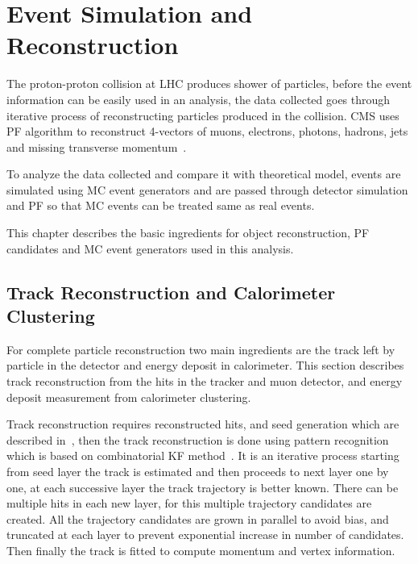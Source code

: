\chapter{
  Event Simulation and Reconstruction
 }\label{ch_reco}

The proton-proton collision at \gls{LHC} produces shower of particles, before
the event information can be easily used in an analysis, the data collected goes
through iterative process of reconstructing particles produced in the collision.
\gls{CMS} uses \gls{PF} algorithm to reconstruct 4-vectors of muons, electrons,
photons, hadrons, jets and missing transverse momentum~\cite{cms-particle-flow-2017}.

To analyze the data collected and compare it with theoretical model, events are
simulated using \gls{MC} event generators and are passed through detector simulation
and \gls{PF} so that \gls{MC} events can be treated same as real events.

This chapter describes the basic ingredients for object reconstruction, \gls{PF}
candidates and \gls{MC} event generators used in this analysis.

\section{
  Track Reconstruction and Calorimeter Clustering
 }\label{ch_reco:track-calo}

For complete particle reconstruction two main ingredients are the track left by particle
in the detector and energy deposit in calorimeter.
This section describes track reconstruction
from the hits in the tracker and muon detector, and energy deposit measurement from
calorimeter clustering.

Track reconstruction requires reconstructed hits, and seed generation which are
described in~\cite{cms-track-vertex}, then the track reconstruction is done using
pattern recognition which is based on combinatorial \gls{KF} method~\cite{cms-track-reco}.
It is an iterative process starting from seed layer the track is estimated and then
proceeds to next layer one by one, at each successive layer the track trajectory
is better known. There can be multiple hits in each new layer, for this multiple
trajectory candidates are created. All the trajectory candidates are grown in parallel
to avoid bias, and truncated at each layer to prevent exponential increase
in number of candidates. Then finally the track is fitted to compute momentum
and vertex information.

